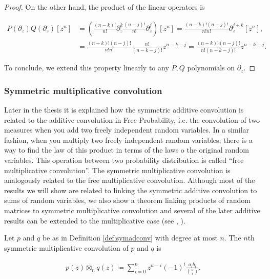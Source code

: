 \begin{proof}
    On the other hand, the product of the linear operators is 

    \begin{align*}
        P(\partial_z)Q(\partial_z)[z^n] &= \left(\frac{(n-k)!}{n!}\partial_z^k \frac{(n-j)!}{n!}\partial_z^j\right)[z^n] = \frac{(n-k)!(n-j)!}{n!n!} \partial_z^{j+k}[z^n], \\
        &= \frac{(n-k)!(n-j)!}{n!n!} \frac{n!}{(n-k-j)!}z^{n-k-j} = \frac{(n-k)!(n-j)!}{n!(n-k-j)!}z^{n-k-j}.
    \end{align*}

    To conclude, we extend this property linearly to any $P,Q$ polynomials on $\partial_z$. 
\end{proof}

\subsubsection{Symmetric multiplicative convolution}

Later in the thesis it is explained how the symmetric additive convolution is related to the additive convolution in Free Probability, i.e. the convolution of two measures when you add two freely independent random variables. In a similar fashion, when you multiply two freely independent random variables, there is a way to find the law of this product in terms of the laws o the original random variables. This operation between two probability distribution is called ``free multiplicative convolution''. The symmetric multiplicative convolution is analogously related to the free multiplicative convolution. Although most of the results we will show are related to linking the symmetric additive convolution to sums of random variables, we also show a theorem linking products of random matrices to symmetric multiplicative convolution and several of the later additive results can be extended to the multiplicative case (see \cite{marcus2021polynomial}, \cite{article:finitefree}).

\begin{definition}
    Let $p$ and $q$ be as in Definition \ref{def:symadconv} with degree at most $n$. The $n$th symmetric multiplicative convolution of $p$ and $q$ is 

    \begin{align*}
        p(z) \boxtimes_n q(z) \coloneqq \sum_{i=0}^n z^{n-i}(-1)^i\frac{a_ib_i}{\binom ni}.
    \end{align*}
\end{definition}

